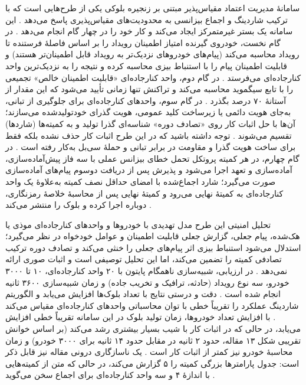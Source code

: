 \documentclass[12pt,a4paper]{article}
\begin{document}
سامانهٔ مدیریت اعتماد مقیاس‌پذیر مبتنی بر زنجیره بلوکی یکی از طرح‌هایی است که با ترکیب شاردینگ و اجماع بیزانسی به محدودیت‌های مقیاس‌پذیری پاسخ می‌دهد \cite{ghovanlooyghajarSBTMSScalableBlockchain2021}. این سامانه یک بستر غیرمتمرکز ایجاد می‌کند و کار خود را در چهار گام انجام می‌دهد \cite{ghovanlooyghajarSBTMSScalableBlockchain2021}. در گام نخست، خودروی گیرنده امتیاز اطمینان رویداد را بر اساس فاصلهٔ فرستنده تا رویداد محاسبه می‌کند (پیام‌های خودرو‌های نزدیک‌تر به رویداد قابل اطمینان‌تر هستند) و قابلیت اطمینان پیام را با استنباط بیزی محاسبه کرده و نتیجه را به نزدیک‌ترین واحد کنارجاده‌ای می‌فرستد \cite{ghovanlooyghajarSBTMSScalableBlockchain2021}. در گام دوم، واحد کنارجاده‌ای «قابلیت اطمینان خالص» تجمیعی را با تابع سیگموید محاسبه می‌کند و تراکنش تنها زمانی تأیید می‌شود که این مقدار از آستانهٔ ۷۰ درصد بگذرد \cite{ghovanlooyghajarSBTMSScalableBlockchain2021}. در گام سوم، واحد‌های کنارجاده‌ای برای جلوگیری از تبانی، به‌جای هویت دائمی یا زیرساخت کلید عمومی، هویت گذرای خودتولیدشده می‌سازند؛ آن‌ها با حل اثبات کار روی «تصادف دوره» شناسه‌ای گذرا تولید و به کمیته‌ها (شارد‌ها) تقسیم می‌شوند \cite{ghovanlooyghajarSBTMSScalableBlockchain2021}. توجه داشته باشید که در این طرح اثبات کار حذف نشده بلکه فقط برای ساخت هویت گذرا و مقاومت در برابر تبانی و حملهٔ سی‌بل به‌کار رفته است \cite{ghovanlooyghajarSBTMSScalableBlockchain2021}. در گام چهارم، در هر کمیته پروتکل تحمل خطای بیزانس عملی با سه فاز پیش‌آماده‌سازی، آماده‌سازی و تعهد اجرا می‌شود و پذیرش پس از دریافت دو‌سوم پیام‌های آماده‌سازی صورت می‌گیرد؛ شارد اجماع‌شده با امضای حداقل نصف کمیته به‌علاوهٔ یک واحد کنارجاده‌ای به کمیتهٔ نهایی می‌رود و کمیتهٔ نهایی پس از محاسبهٔ خلاصهٔ رمزنگاری، دوباره  اجرا کرده و بلوک را منتشر می‌کند \cite{ghovanlooyghajarSBTMSScalableBlockchain2021}.

تحلیل امنیتی این طرح مدل تهدیدی با خودرو‌ها و واحد‌های کنارجاده‌ای موذی یا هک‌شده، پیام جعلی، گزارش جعلی قابلیت اطمینان و عوامل خودخواه در نظر می‌گیرد؛ استدلال می‌شود استنباط بیزی اثر پیام‌های جعلی را خنثی می‌کند و تصادف دوره ترکیب تصادفی کمیته را تضمین می‌کند، اما این تحلیل توصیفی است و اثبات صوری ارائه نمی‌دهد \cite{ghovanlooyghajarSBTMSScalableBlockchain2021}. در ارزیابی، شبیه‌سازی ناهمگام پایتون با ۲۰ واحد کنارجاده‌ای، ۱۰ تا ۳۰۰۰ خودرو، سه نوع رویداد (حادثه، ترافیک و تخریب جاده) و زمان شبیه‌سازی ۳۶۰۰ ثانیه انجام شده است \cite{ghovanlooyghajarSBTMSScalableBlockchain2021}. دقت و درستی نتایج با تعداد بلوک‌ها افزایش می‌یابد و الگوریتم شاردینگ عملکرد را تقریباً خطی با توان محاسباتی واحد‌های کنارجاده‌ای مقیاس می‌کند \cite{ghovanlooyghajarSBTMSScalableBlockchain2021}. با افزایش تعداد خودروها، زمان تولید بلوک در این سامانه تقریباً خطی افزایش می‌یابد، در حالی که در اثبات کار با شیب بسیار بیشتری رشد می‌کند (بر اساس خوانش تقریبی شکل ۱۳ مقاله، حدود ۲ ثانیه در مقابل حدود ۱۴ ثانیه برای ۳۰۰۰ خودرو) و زمان محاسبهٔ خودرو نیز کمتر از اثبات کار است \cite{ghovanlooyghajarSBTMSScalableBlockchain2021}. یک ناسازگاری درونی مقاله نیز قابل ذکر است: جدول پارامتر‌ها بزرگی کمیته را ۵ گزارش می‌کند، در حالی که متن از کمیته‌هایی با اندازهٔ ۴ و سه واحد کنارجاده‌ای برای اجماع سخن می‌گوید \cite{ghovanlooyghajarSBTMSScalableBlockchain2021}.
\end{document}
